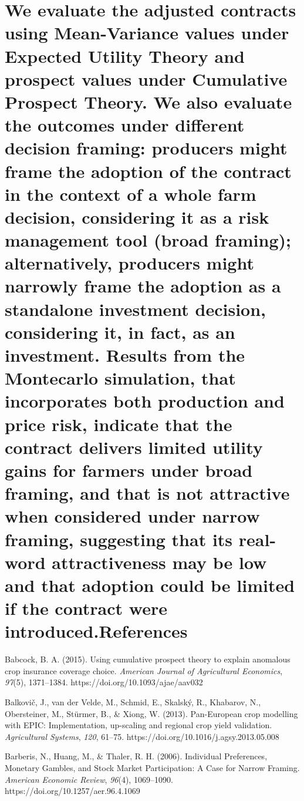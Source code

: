 \documentclass[
]{article}
\begin{document}
\section{We evaluate the adjusted contracts using Mean-Variance values
under Expected Utility Theory and prospect values under Cumulative
Prospect Theory. We also evaluate the outcomes under different decision
framing: producers might frame the adoption of the contract in the
context of a whole farm decision, considering it as a risk management
tool (broad framing); alternatively, producers might narrowly frame the
adoption as a standalone investment decision, considering it, in fact,
as an investment. Results from the Montecarlo simulation, that
incorporates both production and price risk, indicate that the contract
delivers limited utility gains for farmers under broad framing, and that
is not attractive when considered under narrow framing, suggesting that
its real-word attractiveness may be low and that adoption could be
limited if the contract were
introduced.References}\label{we-evaluate-the-adjusted-contracts-using-mean-variance-values-under-expected-utility-theory-and-prospect-values-under-cumulative-prospect-theory.-we-also-evaluate-the-outcomes-under-different-decision-framing-producers-might-frame-the-adoption-of-the-contract-in-the-context-of-a-whole-farm-decision-considering-it-as-a-risk-management-tool-broad-framing-alternatively-producers-might-narrowly-frame-the-adoption-as-a-standalone-investment-decision-considering-it-in-fact-as-an-investment.-results-from-the-montecarlo-simulation-that-incorporates-both-production-and-price-risk-indicate-that-the-contract-delivers-limited-utility-gains-for-farmers-under-broad-framing-and-that-is-not-attractive-when-considered-under-narrow-framing-suggesting-that-its-real-word-attractiveness-may-be-low-and-that-adoption-could-be-limited-if-the-contract-were-introduced.references}

Babcock, B. A. (2015). Using cumulative prospect theory to explain
anomalous crop insurance coverage choice. \emph{American Journal of
Agricultural Economics}, \emph{97}(5), 1371--1384.
https://doi.org/10.1093/ajae/aav032

Balkovič, J., van der Velde, M., Schmid, E., Skalský, R., Khabarov, N.,
Obersteiner, M., Stürmer, B., \& Xiong, W. (2013). Pan-European crop
modelling with EPIC: Implementation, up-scaling and regional crop yield
validation. \emph{Agricultural Systems}, \emph{120}, 61--75.
https://doi.org/10.1016/j.agsy.2013.05.008

Barberis, N., Huang, M., \& Thaler, R. H. (2006). Individual
Preferences, Monetary Gambles, and Stock Market Participation: A Case
for Narrow Framing. \emph{American Economic Review}, \emph{96}(4),
1069--1090. https://doi.org/10.1257/aer.96.4.1069
\end{document}
